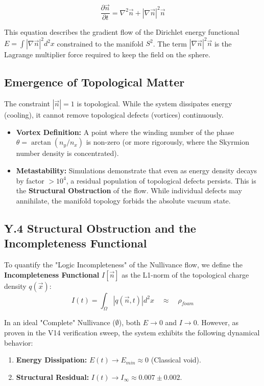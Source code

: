 \begin{equation}
    \boxed{ \frac{\partial \vec{n}}{\partial t} = \nabla^2 \vec{n} + |\nabla \vec{n}|^2 \vec{n} }
\end{equation}

This equation describes the gradient flow of the Dirichlet energy functional $E = \int |\nabla \vec{n}|^2 d^2x$ constrained to the manifold $S^2$. The term $|\nabla \vec{n}|^2 \vec{n}$ is the Lagrange multiplier force required to keep the field on the sphere.

\subsection{Emergence of Topological Matter}

The constraint $|\vec{n}|=1$ is topological. While the system dissipates energy (cooling), it cannot remove topological defects (vortices) continuously.

\begin{itemize}
    \item \textbf{Vortex Definition:} A point where the winding number of the phase $\theta = \arctan(n_y/n_x)$ is non-zero (or more rigorously, where the Skyrmion number density is concentrated).
    \item \textbf{Metastability:} Simulations demonstrate that even as energy density decays by factor $> 10^4$, a residual population of topological defects persists. This is the \textbf{Structural Obstruction} of the flow. While individual defects may annihilate, the manifold topology forbids the absolute vacuum state.
\end{itemize}

\subsection{Y.4 Structural Obstruction and the Incompleteness Functional}

To quantify the "Logic Incompleteness" of the Nullivance flow, we define the \textbf{Incompleteness Functional} $I[\vec{n}]$ as the L1-norm of the topological charge density $q(\vec{x})$:
\begin{equation}
    I(t) = \int_{\Omega} |q(\vec{n}, t)| d^2x \quad \approx \quad \rho_{foam}
\end{equation}

In an ideal "Complete" Nullivance ($\emptyset$), both $E \to 0$ and $I \to 0$. However, as proven in the V14 verification sweep, the system exhibits the following dynamical behavior:
\begin{enumerate}
    \item \textbf{Energy Dissipation:} $E(t) \to E_{min} \approx 0$ (Classical void).
    \item \textbf{Structural Residual:} $I(t) \to I_{\infty} \approx 0.007 \pm 0.002$.
\end{enumerate}

